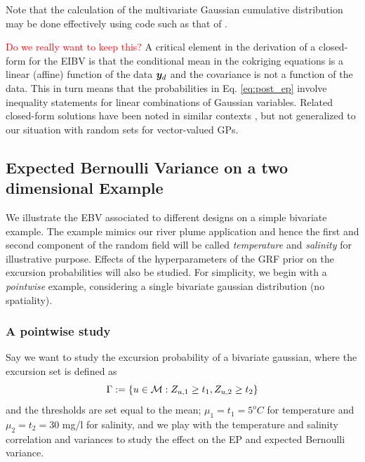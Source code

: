 \documentclass[aoas]{imsart}
\begin{document}
Note that the calculation of the multivariate Gaussian cumulative distribution
may be done effectively using code such as that of
\cite{genz2009computation}. 

\textcolor{red}{Do we really want to keep this?}
A critical element in the derivation of a closed-form for the EIBV is
that the conditional mean in the cokriging equations is a linear
(affine) function of the data ${\boldsymbol y}_d$ and the covariance is not a
function of the data. This in turn means that the probabilities in Eq.
\eqref{eq:post_ep} involve inequality statements for linear
combinations of Gaussian variables. Related closed-form solutions have
been noted in similar contexts \citep{bhattacharjya2013value,
  chevalier2014fast,stroh}, but not generalized to our situation with
random sets for vector-valued GPs.











\subsection{Expected Bernoulli Variance on a two dimensional Example}
\label{Sec:UnivarEx}
We illustrate the EBV associated to different designs on a simple bivariate example. The example mimics our river plume application and hence the first and second component of the random field will be called \textit{temperature} and \textit{salinity} for illustrative purpose. Effects of the hyperparameters of the GRF prior on the excursion probabilities will also be studied. For simplicity, we begin with a \textit{pointwise} example, considering a single bivariate gaussian distribution (no spatiality).

\subsubsection{A pointwise study}
Say we want to study the excursion probability of a bivariate gaussian, where the excursion set is defined as
\[
\Gamma := \lbrace u \in \mathcal{M}: Z_{u, 1} \geq t_1, Z_{u, 2}\geq t_2\rbrace
\]
and the thresholds are set equal to the mean; $\mu_1=t_1=5^o C$ for temperature and  $\mu_2=t_2=30$ mg/l for salinity, and we play with the temperature and salinity correlation and variances to study the effect on the EP and expected Bernoulli variance.
\end{document}
